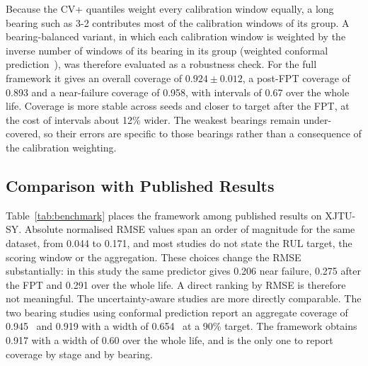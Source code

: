 \documentclass[review]{elsarticle}
\begin{document}
Because the CV+ quantiles weight every calibration window equally, a
long bearing such as 3-2 contributes most of the calibration windows of
its group. A bearing-balanced variant, in which each calibration window
is weighted by the inverse number of windows of its bearing in its
group (weighted conformal prediction~\cite{tibshirani2019conformal}),
was therefore evaluated as a robustness check. For the full framework
it gives an overall coverage of $0.924 \pm 0.012$, a post-FPT coverage
of 0.893 and a near-failure coverage of 0.958, with intervals of 0.67
over the whole life. Coverage is more stable across seeds and closer to
target after the FPT, at the cost of intervals about 12\% wider. The
weakest bearings remain under-covered, so their errors are specific to
those bearings rather than a consequence of the calibration weighting.

\subsection{Comparison with Published Results}
\label{sec:res_benchmark}

Table~\ref{tab:benchmark} places the framework among published results
on XJTU-SY. Absolute normalised RMSE values span an order of magnitude
for the same dataset, from 0.044 to 0.171, and most studies do not
state the RUL target, the scoring window or the aggregation. These
choices change the RMSE substantially: in this study the same
predictor gives 0.206 near failure, 0.275 after the FPT and 0.291 over
the whole life. A direct ranking by RMSE is therefore not meaningful.
The uncertainty-aware studies are more directly comparable. The two
bearing studies using conformal prediction report an aggregate coverage
of 0.945~\cite{wang_uncertainty-aware_2026} and 0.919 with a width of
0.654~\cite{11373138} at a 90\% target. The framework obtains 0.917
with a width of 0.60 over the whole life, and is the only one to report
coverage by stage and by bearing.
\end{document}
